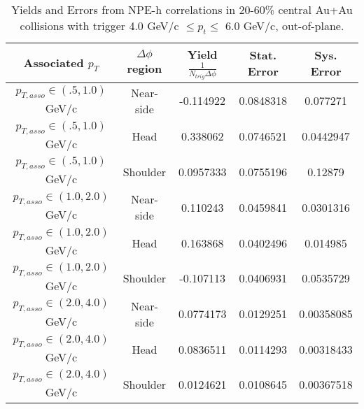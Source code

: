 \begin{table}
\centering
\begin{tabular}{|c|c|c|c|c|}
\hline
Associated $p_T$    & $\Delta\phi$ region & Yield $\frac{1}{N_{trig} \Delta\phi}$ & Stat. Error & Sys. Error\\
\hline
$p_{T,asso} \in(.5, 1.0)$ GeV/c  & Near-side & -0.114922 & 0.0848318 & 0.077271 \\
\hline
$p_{T,asso} \in(.5, 1.0)$ GeV/c  & Head & 0.338062 & 0.0746521 & 0.0442947 \\
\hline
$p_{T,asso} \in(.5, 1.0)$ GeV/c  & Shoulder & 0.0957333 & 0.0755196 & 0.12879 \\
\hline
$p_{T,asso} \in(1.0, 2.0)$ GeV/c  & Near-side & 0.110243 & 0.0459841 & 0.0301316 \\
\hline
$p_{T,asso} \in(1.0, 2.0)$ GeV/c  & Head & 0.163868 & 0.0402496 & 0.014985 \\
\hline
$p_{T,asso} \in(1.0, 2.0)$ GeV/c  & Shoulder & -0.107113 & 0.0406931 & 0.0535729 \\
\hline
$p_{T,asso} \in(2.0, 4.0)$ GeV/c  & Near-side & 0.0774173 & 0.0129251 & 0.00358085 \\
\hline
$p_{T,asso} \in(2.0, 4.0)$ GeV/c  & Head & 0.0836511 & 0.0114293 & 0.00318433 \\
\hline
$p_{T,asso} \in(2.0, 4.0)$ GeV/c  & Shoulder & 0.0124621 & 0.0108645 & 0.00367518 \\
\hline
\end{tabular}
\caption[Yields and Errors in Au+Au Correlations, Out-of-Plane, 20-60\%, Low Trigger]{Yields and Errors from NPE-h correlations in 20-60\% central Au+Au collisions with trigger 4.0 GeV/c $\leq p_t \leq$ 6.0 GeV/c, out-of-plane.}
\label{tab:OutPlaneLow}
\end{table}


